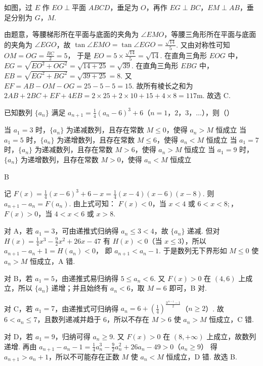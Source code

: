 \begin{solution}
如图，过 \(E\) 作 \(EO\perp \text{平面 }ABCD\)，垂足为 \(O\)，再作 \(EG\perp BC\)，\(EM\perp AB\)，垂足分别为 \(G\)，\(M\).


由题意，等腰梯形所在平面与底面的夹角为 \(\angle EMO\)，等腰三角形所在平面与底面的夹角为 \(\angle EGO\)，故
\(\tan \angle EMO=\tan \angle EGO=\frac{\sqrt{14}}{5}\).
又由对称性可知
\(OM=OG=\frac{BC}{2}=5\)，
于是
\(EO=5\times \frac{\sqrt{14}}{5}=\sqrt{14}\).
在直角三角形 \(EOG\) 中，
\(EG=\sqrt{EO^2+OG^2}=\sqrt{14+25}=\sqrt{39}\).
在直角三角形 \(EBG\) 中，
\(EB=\sqrt{EG^2+BG^2}=\sqrt{39+25}=8\).
又 \(EF=AB-OM-OG=25-5-5=15\).
故所有棱长之和为
\(2AB+2BC+EF+4EB =2\times 25+2\times 10+15+4\times 8 =117\text{m}\).
故选 C.
\end{solution}

\begin{problem}
已知数列 \(\{a_n\}\) 满足 \(a_{n+1}=\frac{1}{4}(a_n-6)^3+6\)（\(n=1\)，\(2\)，\(3\)，\(\dots\)），则（\quad）

\choices
    {当 \(a_1=3\) 时，\(\{a_n\}\) 为递减数列，且存在常数 \(M\le 0\)，使得 \(a_n>M\) 恒成立}
    {当 \(a_1=5\) 时，\(\{a_n\}\) 为递增数列，且存在常数 \(M\le 6\)，使得 \(a_n<M\) 恒成立}
    {当 \(a_1=7\) 时，\(\{a_n\}\) 为递减数列，且存在常数 \(M>6\)，使得 \(a_n>M\) 恒成立}
    {当 \(a_1=9\) 时，\(\{a_n\}\) 为递增数列，且存在常数 \(M>0\)，使得 \(a_n<M\) 恒成立}
\end{problem}

\begin{answer}
B
\end{answer}

\begin{solution}
记
\(F(x)=\frac{1}{4}(x-6)^3+6-x =\frac{1}{4}(x-4)(x-6)(x-8)\).
则
\(a_{n+1}-a_n=F(a_n)\).
由上式可知：
\(F(x)<0\)，\(\text{当 }x<4\text{\ 或\ }6<x<8;\)，\(F(x)>0\)，\(\text{当 }4<x<6\text{\ 或\ }x>8\).

对 A，若 \(a_1=3\)，可由递推式归纳得 \(a_n\le 3<4\)，故 \(\{a_n\}\) 递减. 但对
\(H(x)=\frac{1}{4}x^3-\frac{9}{2}x^2+26x-47\)
有 \(H(x)<0\)（当 \(x\le 3\)），所以
\(a_{n+1}-a_n+1=H(a_n)<0\)，
即 \(a_{n+1}<a_n-1\). 于是数列无下界形如 \(M\le 0\) 使 \(a_n>M\) 恒成立，A 错.

对 B，若 \(a_1=5\)，由递推式易归纳得
\(5\le a_n<6\).
又 \(F(x)>0\) 在 \((4,6)\) 上成立，所以 \(\{a_n\}\) 递增；并且始终有 \(a_n<6\)，取 \(M=6\) 即可，B 对.

对 C，若 \(a_1=7\)，由递推式可归纳得
\(a_n=6+\left(\frac{1}{4}\right)^{\frac{3^{\,n-1}-1}{2}}\)（\(n\ge 2\)）.
故 \(6<a_n\le 7\)，且数列递减并趋于 6，所以不存在 \(M>6\) 使 \(a_n>M\) 恒成立，C 错.

对 D，若 \(a_1=9\)，归纳可得 \(a_n\ge 9\). 又 \(F(x)>0\) 在 \((8,+\infty)\) 上成立，故数列递增. 再由
\(a_{n+1}-a_n-1=\frac{1}{4}a_n^3-\frac{9}{2}a_n^2+26a_n-49>0\)（\(a_n\ge 9\)）
得 \(a_{n+1}>a_n+1\)，所以不可能存在正数 \(M\) 使 \(a_n<M\) 恒成立，D 错.
故选 B.
\end{solution}
